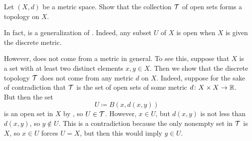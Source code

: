 \documentclass[../main.tex]{subfiles}
\begin{document}
\begin{exe} \label{exe:metric-topology}
    Let $(X,d)$ be a metric space. Show that the collection $\mathcal{T}$ of open sets forms a topology on $X$.
\end{exe}
\begin{remark}
    In fact,  is a generalization of . Indeed, any subset $U$ of $X$ is open when $X$ is given the discrete metric.
\end{remark}
However,  does not come from a metric in general. To see this, suppose that $X$ is a set with at least two distinct elements $x,y\in X$. Then we show that the discrete topology $\mathcal{T}$ does not come from any metric $d$ on $X$. Indeed, suppose for the sake of contradiction that $\mathcal{T}$ is the set of open sets of some metric $d\colon X\times X\to \mathbb R$. But then the set
\[U\coloneqq B(x,d(x,y))\]
is an open set in $X$ by , so $U\in\mathcal{T}$. However, $x\in U$, but $d(x,y)$ is not less than $d(x,y)$, so $y\notin U$. This is a contradiction because the only nonempty set in $\mathcal{T}$ is $X$, so $x\in U$ forces $U=X$, but then this would imply $y\in U$.
\end{document}
